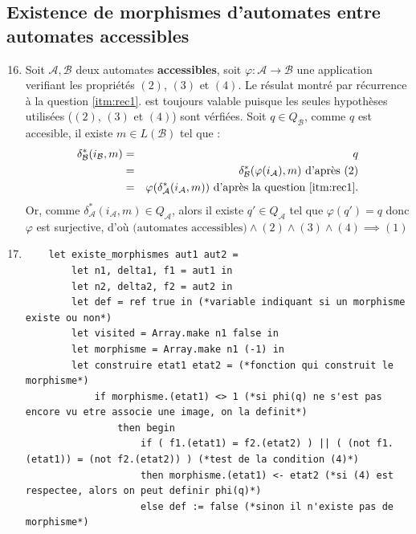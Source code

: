 \documentclass{article}
\begin{document}
\subsection{Existence de morphismes d'automates entre automates accessibles}

\begin{enumerate}
    \setcounter{enumi}{15}
    
    \item \label{itm:accessible} Soit $\mathcal{A}, \mathcal{B}$ deux automates \textbf{accessibles}, soit $\varphi : \mathcal{A} \rightarrow \mathcal{B}$ une application verifiant les propriétés $(2)$, $(3)$ et $(4)$. Le résulat montré par récurrence à la question \ref{itm:rec1}. est toujours valable puisque les seules hypothèses utilisées ($(2)$, $(3)$ et $(4)$) sont vérfiées. \newline
    Soit $q \in Q_\mathcal{B}$, comme $q$ est accesible, il existe $m \in L(\mathcal{B})$ tel que :
    \begin{eqnarray*}
        \delta^*_\mathcal{B}(i_\mathcal{B}, m) & = & q \\
        & = & \delta^*_\mathcal{B}(\varphi(i_\mathcal{A}), m) \text{ d'après $(2)$} \\
        & = & \varphi(\delta^*_\mathcal{A}(i_\mathcal{A}, m)) \text{ d'après la question \ref{itm:rec1}.}
    \end{eqnarray*}
    Or, comme $\delta^*_\mathcal{A}(i_\mathcal{A}, m) \in Q_\mathcal{A}$, alors il existe $q' \in Q_\mathcal{A}$ tel que $\varphi(q') = q$ donc $\varphi$ est surjective, d'où $\boxed{\text{(automates accessibles)} \land (2) \land (3) \land (4) \implies (1)}$
    \item  
    \begin{verbatim}
    let existe_morphismes aut1 aut2 =
        let n1, delta1, f1 = aut1 in 
        let n2, delta2, f2 = aut2 in
        let def = ref true in (*variable indiquant si un morphisme existe ou non*)
        let visited = Array.make n1 false in
        let morphisme = Array.make n1 (-1) in 
        let construire etat1 etat2 = (*fonction qui construit le morphisme*)
            if morphisme.(etat1) <> 1 (*si phi(q) ne s'est pas encore vu etre associe une image, on la definit*)
                then begin
                    if ( f1.(etat1) = f2.(etat2) ) || ( (not f1.(etat1)) = (not f2.(etat2)) ) (*test de la condition (4)*)
                    then morphisme.(etat1) <- etat2 (*si (4) est respectee, alors on peut definir phi(q)*)
                    else def := false (*sinon il n'existe pas de morphisme*)

\end{verbatim}
\end{enumerate}
\end{document}
